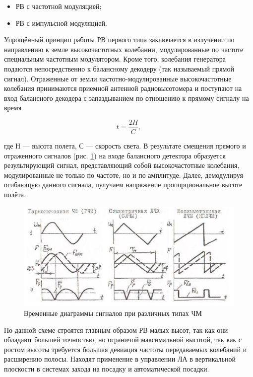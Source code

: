 \documentclass[utf8x, 14pt, oneside, a4paper]{article}
\begin{document}
		\begin{itemize}
			\item РВ с частотной модуляцией;
			\item РВ с импульсной модуляцией.
		\end{itemize}
	
		Упрощённый принцип работы РВ первого типа заключается в излучении по направлению к земле высокочастотных колебании, модулированные по частоте специальным частотным модулятором. Кроме того, колебания генератора подаются непосредственно к балансному декодеру (так называемый прямой сигнал). Отраженные от земли частотно-модулированные высокочастотные колебания принимаются приемной антенной радиовысотомера и поступают на вход балансного декодера с запаздыванием по отношению к прямому сигналу на время
		
		\begin{equation}
			t=\frac{2H}{C},
		\end{equation}
			
		где Н --- высота полета, С --- скорость света. В результате смещения прямого и отраженного сигналов (рис. \ref{fig:RV_ChM}) на входе балансного детектора образуется результирующий сигнал, представляющий собой высокочастотные колебания, модулированные не только по частоте, но и по амплитуде. Далее, демодулируя огибающую данного сигнала, пулучаем напряжение пропорциональное высоте полёта.
		
		\begin{figure}[H]
			\centering
			\includegraphics[width=0.7\linewidth]{"Рисунки/РВ с ЧМ"}
			\caption{Временные диаграммы сигналов при различных типах ЧМ}
			\label{fig:RV_ChM}
		\end{figure}
		
		По данной схеме строятся главным образом РВ малых высот, так как они обладают большей точностью, но ограничой максимальной высотой, так как с ростом высоты требуется большая девиация частоты передаваемых колебаний и расширению полосы. Находят применение в управлении ЛА в вертикальной плоскости в системах захода на посадку и автоматической посадки.
		
\end{document}
